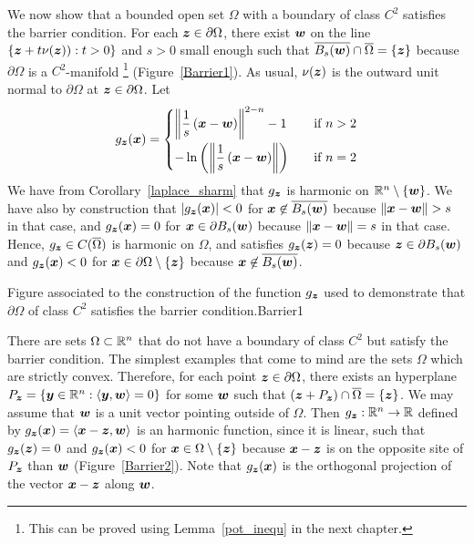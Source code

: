 We now show that a bounded open set $\Omega$ with a boundary of class
$C^2$ satisfies the barrier condition.   For each
${\bm{z}} \in \partial \Omega$, there exist ${\bm{w}}$ on the line
$\displaystyle \{ {\bm{z}} + t\nu({\bm{z}})) : t > 0 \}$
and $s>0$ small enough such that
$\displaystyle \overline{B_s({\bm{w}})} \cap \overline{\Omega} = \{{\bm{z}}\}$
because $\partial \Omega$ is a $C^2$-manifold \footnote{This can be
proved using Lemma~\ref{pot_inequ} in the next chapter.}
(Figure~\ref{Barrier1}).  As usual, $\nu({\bm{z}})$ is the
outward unit normal to $\partial \Omega$ at
${\bm{z}} \in \partial \Omega$.  Let
\[
g_{{\bm{z}}}({\bm{x}})
= \begin{cases}
\displaystyle \left\| \frac{1}{s}\,({\bm{x}}-{\bm{w}}) \right\|^{2-n} - 1
& \quad \text{if} \ n > 2 \\[0.8em]
\displaystyle
-\ln\left(\left\| \frac{1}{s}\, ({\bm{x}} - {\bm{w}}) \right\|\right)
& \quad \text{if} \ n = 2
\end{cases}
\]
We have from Corollary~\ref{laplace_sharm} that
$g_{{\bm{z}}}$ is harmonic on $\mathbb{R}^n\setminus \{{\bm{w}}\}$.
We have also by construction that
$\displaystyle |g_{{\bm{z}}}({\bm{x}})| < 0$ for
${\bm{x}} \not\in \overline{B_s({\bm{w}})}$ because
$\|{\bm{x}} - {\bm{w}}\| > s$ in that case, and
$\displaystyle g_{{\bm{z}}}({\bm{x}}) = 0$ for
${\bm{x}} \in \partial B_s({\bm{w}})$ because
$\|{\bm{x}} - {\bm{w}}\| = s$ in that case.
Hence, $g_{{\bm{z}}} \in C(\overline{\Omega})$ is harmonic on
$\Omega$, and satisfies $g_{{\bm{z}}}({\bm{z}}) = 0$ because
${\bm{z}} \in \partial B_s({\bm{w}})$ and $g_{{\bm{z}}}({\bm{x}}) < 0$ for 
${\bm{x}} \in \partial \Omega \setminus \{{\bm{z}}\}$ because
${\bm{x}} \not\in \overline{B_s({\bm{w}})}$.

{Figure associated to the construction of the function $g_{{\bm{z}}}$
used to demonstrate that $\partial \Omega$ of class $C^2$ satisfies the
barrier condition.}{Barrier1}

There are sets $\Omega \subset \mathbb{R}^n$ that do not have a boundary of
class $C^2$ but satisfy the barrier condition.  The simplest examples
that come to mind are the sets $\Omega$ which are strictly convex.
Therefore, for each point ${\bm{z}} \in \partial \Omega$, there exists an
hyperplane
$P_{{\bm{z}}} = \left\{ {\bm{y}} \in \mathbb{R}^n : \left\langle{{\bm{y}}} , {{\bm{w}}}\right\rangle = 0 \right\}$
for some ${\bm{w}}$ such that
$({\bm{z}} + P_{{\bm{z}}}) \cap \overline{\Omega} = \{{\bm{z}}\}$.
We may assume that ${\bm{w}}$ is a unit vector pointing outside of $\Omega$.
Then $g_{{\bm{z}}}:\mathbb{R}^n \to \mathbb{R}$ defined by
$g_{{\bm{z}}}({\bm{x}}) = \left\langle{{\bm{x}} - {\bm{z}}} , {{\bm{w}}}\right\rangle$ is an
harmonic function, since it is linear, such that
$g_{{\bm{z}}}({\bm{z}}) = 0$ and
$g_{{\bm{z}}}({\bm{x}}) < 0$ for ${\bm{x}} \in \Omega \setminus \{{\bm{z}}\}$
because ${\bm{x}}-{\bm{z}}$ is on the opposite site of $P_{{\bm{z}}}$ than
${\bm{w}}$ (Figure~\ref{Barrier2}).
Note that $g_{{\bm{z}}}({\bm{x}})$ is the orthogonal projection of the vector 
${\bm{x}} - {\bm{z}}$ along ${\bm{w}}$.


